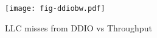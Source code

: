 \begin{figure}[t]
\texttt{[image: fig-ddiobw.pdf]}
\caption{LLC misses from DDIO vs Throughput}
\label{fig:ddiobw}
\end{figure}
